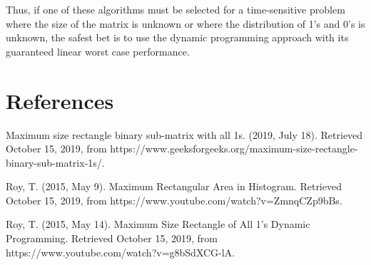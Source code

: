 \documentclass{article}
\begin{document}
Thus, if one of these algorithms must be selected for a time-sensitive problem where the size of the matrix is unknown or where the distribution of 1's and 0's is unknown, the safest bet is to use the dynamic programming approach with its guaranteed linear worst case performance.

\section{References}
\parindent=0pt
\hangindent=15pt
Maximum size rectangle binary sub-matrix with all 1s. (2019, July 18). Retrieved October 15, 2019, from https://www.geeksforgeeks.org/maximum-size-rectangle-binary-sub-matrix-1s/.

\hangindent=15pt
Roy, T. (2015, May 9). Maximum Rectangular Area in Histogram. Retrieved October 15, 2019, from https://www.youtube.com/watch?v=ZmnqCZp9bBs. 

\hangindent=15pt
Roy, T. (2015, May 14). Maximum Size Rectangle of All 1's Dynamic Programming. Retrieved October 15, 2019, from https://www.youtube.com/watch?v=g8bSdXCG-lA. 
\end{document}
